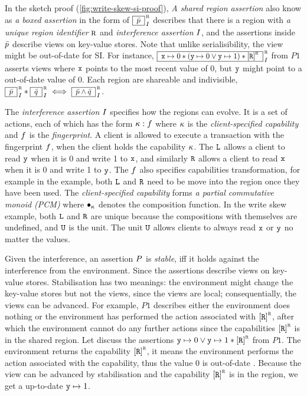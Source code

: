 In the sketch proof (\cref{fig:write-skew-si-proof}), \emph{A shared region assertion} also know as \emph{a boxed assertion} in the form of \( \boxass{\bar{\lpre}}{\lrid}{\intass}\) describes that there is a region with \emph{a unique region identifier} \( \lrid \) and \emph{interference  assertion} \( I \), and the assertions inside \( \bar{p} \) describe views on key-value stores.
Note that unlike serialisibility, the view might be out-of-date for SI.
For instance, \( \boxass{\vx \pt 0 \sep ( \vy \pt 0 \lor \vy \pt 1 ) \sep \cass{\CB{R}}{\lrid} }{\lrid}{\intass}\) from \( P1 \) asserts views where \( \texttt{x} \) points to the most recent value of 0, but \( \texttt{y} \) might point to a out-of-date value of 0.
Each region are shareable and indivisible, \ie \( \boxass{\bar{\lpre}}{\lrid}{\intass} \sep \boxass{\bar{\lpost}}{\lrid}{\intass} \iff \boxass{\bar{\lpre} \land \bar{\lpost}}{\lrid}{\intass}\).

The \emph{interference assertion} \( I \) specifies how the regions can evolve.
It is a set of actions, each of which has the form \( \kappa : f \) where \( \kappa \) is the \emph{client-specified capability} and \( f \) is the \emph{fingerprint}.
A client is allowed to execute a transaction with the fingerprint \( f \), when the client holds the capability \( \kappa \).
The \( \texttt{L}\) allows a client to read \( \texttt{y} \) when it is 0 and write 1 to \( \texttt{x} \), and similarly \( \texttt{R} \) allows a client to read \( \texttt{x} \) when it is 0 and write 1 to \( \texttt{y} \).
The \( f \) also specifies capabilities transformation, for example in the example, both \( \texttt{L} \) and \( \texttt{R} \) need to be move into the region once they have been used.
The \emph{client-specified capability} forms \emph{a partial commutative monoid (PCM)} where \( \bullet_{\kappa} \) denotes the composition function.
In the write skew example, both \( \texttt{L} \) and \( \texttt{R} \) are unique because the compositions with themselves are undefined, and \( \texttt{U} \) is the unit.
The unit \( \texttt{U} \) allows clients to always read \( \texttt{x} \) or \( \texttt{y} \) no matter the values.

Given the interference, an assertion \( P \) is \emph{stable}, iff it holds against the interference from the environment.
Since the assertions describe views on key-value stores.
Stabilisation has two meanings: the environment might change the key-value stores but not the views, since the views are local; consequentially, the views can be advanced.
For example, \( P1 \) describes either the environment does nothing or the environment has performed the action associated with \( \cass{\CB{R}}{\lrid}\), 
after which the environment cannot do any further actions since the capabilities \( \cass{\CB{R}}{\lrid}\) is in the shared region.
Let discuss the assertions \( \vy \pt 0  \lor \vy \pt 1  \sep \cass{\CB{R}}{\lrid} \) from \( P1 \).
The environment returns the capability \( \cass{\CB{R}}{\lrid} \), it means the environment performs the action associated with the capability, thus  the value \( 0 \) is out-of-date .
Because the view can be advanced by stabilisation and the capability \( \cass{\CB{R}}{\lrid} \) is in the region, we get a up-to-date \( \texttt{y} \mapsto 1 \).

